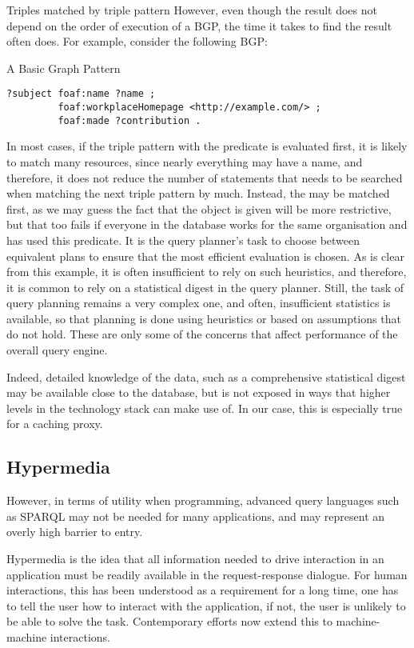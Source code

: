 \begin{example}{Triples matched by triple pattern}
However, even though the result does not depend on the order of
execution of a BGP, the time it takes to find the result often does. For
example, consider the following BGP:
\begin{example}{A Basic Graph Pattern}\label{ex:bgp}
\begin{verbatim}
?subject foaf:name ?name ;
         foaf:workplaceHomepage <http://example.com/> ;
         foaf:made ?contribution .
\end{verbatim}
\end{example}
In most cases, if the triple pattern with the 
predicate is evaluated first, it is likely to match many resources,
since nearly everything may have a name, and therefore, it does not
reduce the number of statements that needs to be searched when
matching the next triple pattern by much. Instead, the
 may be matched first, as we may guess
the fact that the object is given will be more restrictive, but that
too fails if everyone in the database works for the same organisation
and has used this predicate. It is the query planner's task to choose
between equivalent plans to ensure that the most efficient evaluation
is chosen. As is clear from this example, it is often insufficient to
rely on such heuristics, and therefore, it is common to rely on a
statistical digest in the query planner. Still, the task of query
planning remains a very complex one, and often, insufficient
statistics is available, so that planning is done using heuristics or
based on assumptions that do not hold. These are only some of the
concerns that affect performance of the overall query engine.

Indeed, detailed knowledge of the data, such as a comprehensive
statistical digest may be available close to the database, but is not
exposed in ways that higher levels in the technology stack can make
use of. In our case, this is especially true for a caching proxy.

\subsection{Hypermedia}

However, in terms of utility when programming, advanced query
languages such as SPARQL may not be needed for many applications, and
may represent an overly high barrier to entry.

Hypermedia is the idea that all information needed to drive
interaction in an application must be readily available in the
request-response dialogue. For human interactions, this has been
understood as a requirement for a long time, one has to tell the user
how to interact with the application, if not, the user is unlikely to
be able to solve the task. Contemporary efforts now extend this to
machine-machine interactions. 


\end{example}
